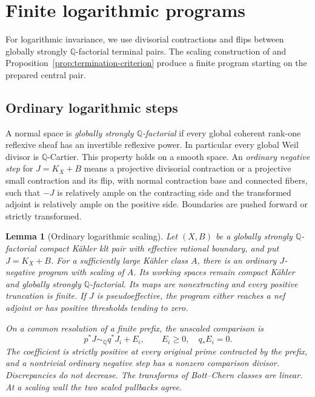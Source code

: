 \documentclass[11pt,a4paper]{article}
\numberwithin{equation}{section}
\newtheorem{lemma}[theorem]{Lemma}
\theoremstyle{definition}
\theoremstyle{remark}
\newcommand{\Q}{\mathbb Q}\newcommand{\R}{\mathbb R}
\begin{document}
\section{Finite logarithmic programs}
\label{sec:finite}

For logarithmic invariance, we use divisorial contractions and
flips between globally strongly $\Q$-factorial terminal pairs.
The scaling construction of \cite[Lemmas~3.6--3.7]{OAI034}
and Proposition~\ref{prop:termination-criterion} produce a finite
program starting on the prepared central pair.

\subsection{Ordinary logarithmic steps}

A normal space is \emph{globally strongly $\Q$-factorial} if every
global coherent rank-one reflexive sheaf has an invertible reflexive
power. In particular every global Weil divisor is $\Q$-Cartier.
This property holds on a smooth space. An \emph{ordinary negative
step} for $J=K_X+B$ means a projective divisorial contraction or a
projective small contraction and its flip, with normal contraction
base and connected fibers, such that $-J$ is relatively ample on the
contracting side and the transformed adjoint is relatively ample on
the positive side. Boundaries are pushed forward or strictly
transformed.

\begin{lemma}[Ordinary logarithmic scaling]
\label{lem:ordinary-scaling}\label{in:scaling}
Let $(X,B)$ be a globally strongly $\Q$-factorial compact Kähler klt
pair with effective rational boundary, and put $J=K_X+B$.
For a sufficiently large Kähler class $A$, there is an ordinary
$J$-negative program with scaling of $A$. Its
working spaces remain compact Kähler and globally strongly
$\Q$-factorial. Its maps are nonextracting and every positive truncation is finite. If $J$ is pseudoeffective, the
program either reaches a nef adjoint or has positive thresholds
tending to zero.

On a common resolution of a finite prefix, the unscaled comparison is
\begin{equation}\label{eq:ordinary-comparison}
 p^*J\sim_{\Q}q^*J_i+E_i,
 \qquad E_i\ge0,\quad q_*E_i=0.
\end{equation}
The coefficient is strictly positive at every original prime
contracted by the prefix, and a nontrivial ordinary negative step has
a nonzero comparison divisor. Discrepancies do not decrease.
The transforms of Bott--Chern classes are linear. At a scaling wall
the two scaled pullbacks agree.
\end{lemma}
\end{document}

